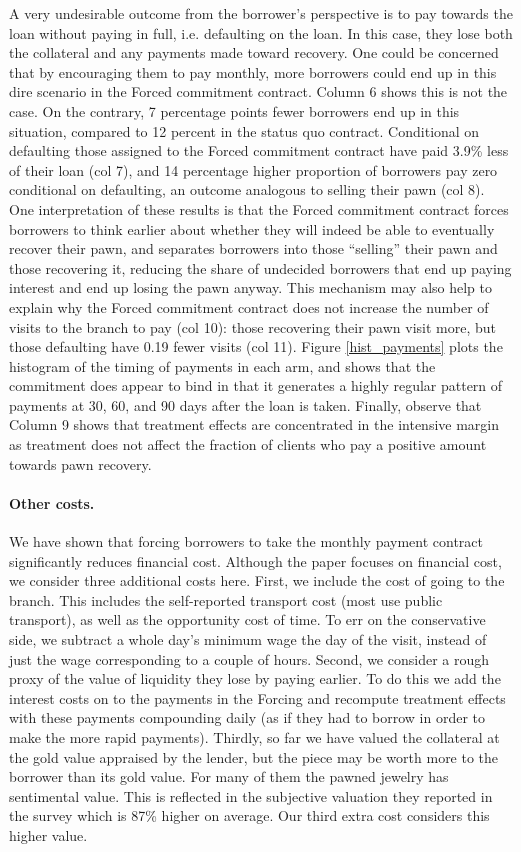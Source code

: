 \documentclass[oneside,11pt]{article}
\begin{document}
A very undesirable outcome from the borrower's perspective is to pay towards the loan without paying in full, i.e. defaulting on the loan. In this case, they lose both the collateral and any payments made toward recovery. One could be concerned that by encouraging them to pay monthly, more borrowers could end up in this dire scenario in the Forced commitment contract. Column 6 shows this is not the case. On the contrary,  7 percentage points fewer borrowers end up in this situation, compared to 12 percent in the status quo contract. Conditional on defaulting those assigned to the Forced commitment contract have paid 3.9\% less of their loan (col 7), and 14 percentage higher proportion of borrowers pay zero conditional on defaulting, an outcome analogous to selling their pawn (col 8). One interpretation of these results is that the Forced commitment contract forces borrowers to think earlier about whether they will indeed be able to eventually recover their pawn, and separates borrowers into those ``selling'' their pawn and those recovering it, reducing the share of undecided borrowers that end up paying interest and end up losing the pawn anyway. This mechanism may also help to explain why the Forced commitment contract does not increase the number of visits to the branch to pay (col 10): those recovering their pawn visit more, but those defaulting have 0.19 fewer visits (col 11). Figure \ref{hist_payments} plots the histogram of the timing of payments in each arm, and shows that the commitment does appear to bind in that it generates a highly regular pattern of payments at 30, 60, and 90 days after the loan is taken. Finally, observe that Column 9 shows that treatment effects are concentrated in the intensive margin as treatment does not affect the fraction of clients who pay a positive amount towards pawn recovery.

\paragraph{Other costs.} We have shown that forcing borrowers to take the monthly payment contract significantly reduces financial cost. Although the paper focuses on financial cost, we consider three additional costs here. First, we include the cost of going to the branch. This includes the self-reported transport cost (most use public transport), as well as the opportunity cost of time. To err on the conservative side, we subtract a whole day's minimum wage the day of the visit, instead of just the wage corresponding to a couple of hours. Second, we consider a rough proxy of the value of liquidity they lose by paying earlier. To do this we add the interest costs on to the payments in the Forcing and recompute treatment effects with these payments compounding daily (as if they had to borrow in order to make the more rapid payments). Thirdly, so far we have valued the collateral at the gold value appraised by the lender, but the piece may be worth more to the borrower than its gold value.  For many of them the pawned jewelry has sentimental value. This is reflected in the subjective valuation they reported in the survey which is 87\% higher on average. Our third extra cost considers this higher value.
\end{document}
